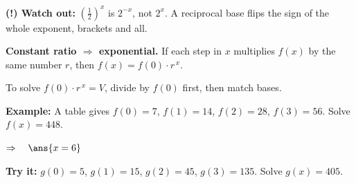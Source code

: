\documentclass[12pt]{article}
\begin{document}
\begin{watchoutbox}
\textbf{(!) Watch out:} $\left(\frac{1}{2}\right)^{x}$ is $2^{-x}$, not $2^{x}$. A reciprocal base flips the sign of the whole exponent, brackets and all.
\end{watchoutbox}


\begin{formulabox}
\textbf{Constant ratio $\Rightarrow$ exponential.} If each step in $x$ multiplies $f(x)$ by the same number $r$, then
$f(x) = f(0) \cdot r^{\,x}$.\par
To solve $f(0)\cdot r^{\,x} = V$, divide by $f(0)$ first, then match bases.
\end{formulabox}

\begin{examplebox}
\textbf{Example:} \quad A table gives $f(0)=7$, $f(1)=14$, $f(2)=28$, $f(3)=56$. Solve $f(x) = 448$.

$\Rightarrow\quad \ans{x = 6}$
\end{examplebox}

\begin{tryitbox}
\textbf{Try it:} \quad $g(0)=5$, $g(1)=15$, $g(2)=45$, $g(3)=135$. Solve $g(x) = 405$.\\[2pt]
\end{tryitbox}
\end{document}
